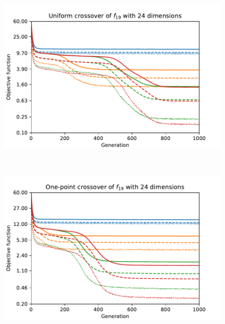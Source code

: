 \begin{figure}[ht!]
\begin{minipage}[t]{0.32\textwidth}
    \end{minipage}
    \hfill
    \begin{minipage}[t]{0.32\textwidth}
        \centering
        \includegraphics[width=\textwidth]{img/runs/fitness_es_crossover_f19_dim24_Uniform.pdf}
    \end{minipage}
    \\
    \centering
    \begin{minipage}[t]{0.32\textwidth}
        \includegraphics[width=\textwidth]{img/runs/fitness_es_crossover_f19_dim24_OnePoint1D.pdf}
    \end{minipage}
    \begin{minipage}[t]{0.32\textwidth}
        \centering

\end{minipage}
\end{figure}
